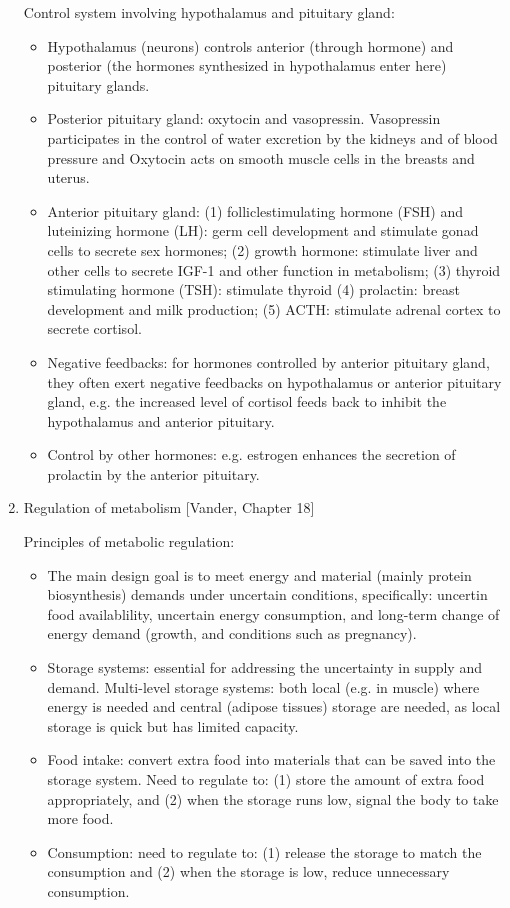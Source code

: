 \documentclass{report}
\begin{document}
\begin{enumerate}
Control system involving hypothalamus and pituitary gland:
\begin{itemize}
\item Hypothalamus (neurons) controls anterior (through hormone) and posterior (the hormones synthesized in hypothalamus enter here) pituitary glands. 

\item Posterior pituitary gland: oxytocin and vasopressin. Vasopressin participates in the control of water excretion by the kidneys and of blood pressure and Oxytocin acts on smooth muscle cells in the breasts and uterus. 

\item Anterior pituitary gland: (1) folliclestimulating hormone (FSH) and luteinizing hormone (LH): germ cell development and stimulate gonad cells to secrete sex hormones; (2) growth hormone: stimulate liver and other cells to secrete IGF-1 and other function in metabolism; (3) thyroid stimulating hormone (TSH): stimulate thyroid (4) prolactin: breast development and milk production; (5) ACTH: stimulate adrenal cortex to secrete cortisol. 

\item Negative feedbacks: for hormones controlled by anterior pituitary gland, they often exert negative feedbacks on hypothalamus or anterior pituitary gland, e.g. the increased level of cortisol feeds back to inhibit the hypothalamus and anterior pituitary. 

\item Control by other hormones: e.g. estrogen enhances the secretion of prolactin by the anterior pituitary. 
\end{itemize}

\item{Regulation of metabolism} [Vander, Chapter 18]

Principles of metabolic regulation:
\begin{itemize}
\item The main design goal is to meet energy and material (mainly protein biosynthesis) demands under uncertain conditions, specifically: uncertin food availablility, uncertain energy consumption, and long-term change of energy demand (growth, and conditions such as pregnancy). 
\item Storage systems: essential for addressing the uncertainty in supply and demand. Multi-level storage systems: both local (e.g. in muscle) where energy is needed and central (adipose tissues) storage are needed, as local storage is quick but has limited capacity. 
\item Food intake: convert extra food into materials that can be saved into the storage system. Need to regulate to: (1) store the amount of extra food appropriately, and (2) when the storage runs low, signal the body to take more food. 
\item Consumption: need to regulate to: (1) release the storage to match the consumption and (2) when the storage is low, reduce unnecessary consumption. 
\end{itemize}


\end{enumerate}
\end{document}
